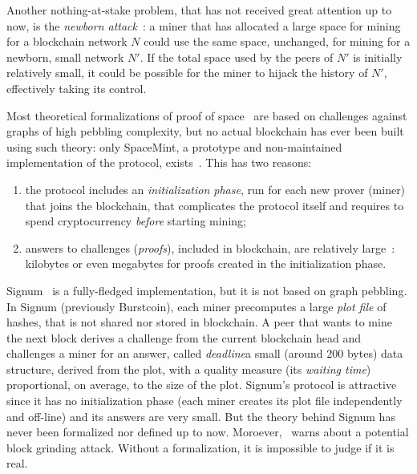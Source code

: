 Another nothing-at-stake problem, that has not received great attention up to now,
is the \emph{newborn attack}~\cite{TangZDWLG0L19}: a miner that has allocated a large space
for mining for a blockchain network $N$ could use the same space, unchanged, for
mining for a newborn, small network $N'$. If the total space used by the peers of $N'$ is
initially relatively small, it could be possible for the miner to hijack the history of $N'$,
effectively taking its control.

Most theoretical formalizations of proof of space~\cite{AtenieseBFG14,DziembowskiFKP15,RenD16} are
based on challenges against graphs of high pebbling complexity, but
no actual blockchain has ever been built using such theory: only SpaceMint, a prototype and non-maintained
implementation of the protocol, exists~\cite{ParkKFGAP18}. This has two reasons:
%
\begin{enumerate}
\item the protocol includes an \emph{initialization phase},
  run for each new prover (miner) that joins the blockchain,
  that complicates the protocol itself and
  requires to spend cryptocurrency \emph{before}
  starting mining;
\item answers to challenges (\emph{proofs}),
  included in blockchain, are relatively large~\cite{AbusalahACKPR17}:
  kilobytes or even megabytes for proofs created in the initialization phase.
\end{enumerate}

Signum~\cite{Signum} is a fully-fledged implementation, but it is not based on graph pebbling.
In Signum (previously Burstcoin),
each miner precomputes a large \emph{plot file} of hashes, that is not shared nor
stored in blockchain.
A peer that wants to mine the next block derives a challenge from the current blockchain head
and challenges a miner for an answer, called
\emph{deadline}\ie a small (around $200$ bytes) data structure, derived from the plot,
with a quality measure
(its \emph{waiting time}) proportional, on average, to the size of the plot.
Signum's protocol is attractive since it has no initialization phase (each miner creates its plot file
independently and off-line) and its answers are very small.
But the theory behind Signum has never been formalized nor defined up to now.
Moroever, \cite{ParkKFGAP18}~warns about a potential block grinding attack.
Without a formalization, it is impossible to judge if it is real.

